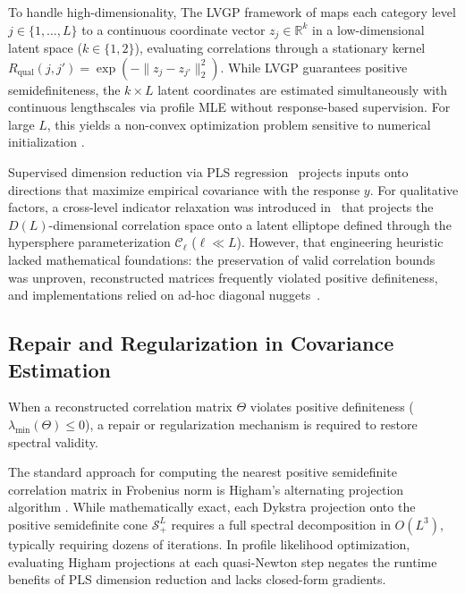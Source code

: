 \documentclass[default,sn-mathphys,Numbered]{sn-jnl}
\theoremstyle{thmstyleone}
\theoremstyle{thmstylethree}
\theoremstyle{thmstyletwo}
\begin{document}
To handle high-dimensionality, The LVGP framework of \citet{zhang2020latent} maps each category level $j \in \{1, \ldots, L\}$ to a continuous coordinate vector $z_j \in \mathbb{R}^k$ in a low-dimensional latent space ($k \in \{1, 2\}$), evaluating correlations through a stationary kernel $R_{\mathrm{qual}}(j, j') = \exp(-\|z_j - z_{j'}\|_2^2)$. While LVGP guarantees positive semidefiniteness, the $k \times L$ latent coordinates are estimated simultaneously with continuous lengthscales via profile MLE without response-based supervision. For large $L$, this yields a non-convex optimization problem sensitive to numerical initialization \citep{oune2021latent,carpintero2025reproducible}.

Supervised dimension reduction via PLS regression~\citep{wold_1975,hellandStructurePartialLeast1988,bouhlel_KPLSK,Bouhlel18} projects inputs onto directions that maximize empirical covariance with the response $y$. For qualitative factors, a cross-level indicator relaxation was introduced in~\citet{saves2023high} that projects the $D(L)$-dimensional correlation space onto a latent elliptope defined through the hypersphere parameterization $\mathcal{C}_\ell$ ($\ell \ll L$). However, that engineering heuristic lacked mathematical foundations: the preservation of valid correlation bounds was unproven, reconstructed matrices frequently violated positive definiteness, and implementations relied on ad-hoc diagonal nuggets~\citep{saves2023smt}.

\subsection{Repair and Regularization in Covariance Estimation}

When a reconstructed correlation matrix $\Theta$ violates positive definiteness ($\lambda_{\min}(\Theta) \le 0$), a repair or regularization mechanism is required to restore spectral validity.

The standard approach for computing the nearest positive semidefinite correlation matrix in Frobenius norm is Higham's alternating projection algorithm \citep{higham2002computing}. While mathematically exact, each Dykstra projection onto the positive semidefinite cone $\mathcal{S}_+^L$ requires a full spectral decomposition in $O(L^3)$, typically requiring dozens of iterations. In profile likelihood optimization, evaluating Higham projections at each quasi-Newton step negates the runtime benefits of PLS dimension reduction and lacks closed-form gradients.
\end{document}
